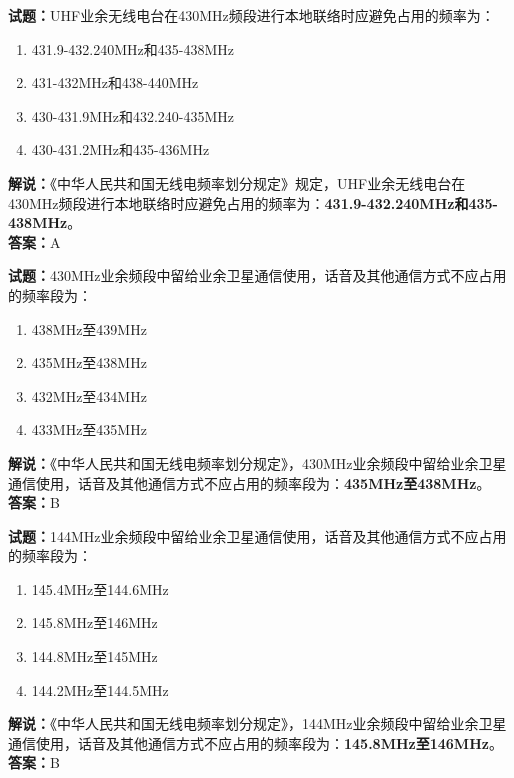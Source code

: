 \documentclass{ctexbook}
\begin{document}
\bigskip


\noindent\textbf{试题：}UHF业余无线电台在430\unit{\MHz}频段进行本地联络时应避免占用的频率为：
\begin{enumerate}[leftmargin=3em]
\item 431.9-432.240\unit{\MHz}和435-438\unit{\MHz}
\item 431-432\unit{\MHz}和438-440\unit{\MHz}
\item 430-431.9\unit{\MHz}和432.240-435\unit{\MHz}
\item 430-431.2\unit{\MHz}和435-436\unit{\MHz}
\end{enumerate}
\noindent\textbf{解说：}《中华人民共和国无线电频率划分规定》规定，UHF业余无线电台在430\unit{\MHz}频段进行本地联络时应避免占用的频率为：\textbf{431.9-432.240\unit{\MHz}和435-438\unit{\MHz}}。\\\noindent\textbf{答案：}A



\bigskip


\noindent\textbf{试题：}430\unit{\MHz}业余频段中留给业余卫星通信使用，话音及其他通信方式不应占用的频率段为：
\begin{enumerate}[leftmargin=3em]
\item 438\unit{\MHz}至439\unit{\MHz}
\item 435\unit{\MHz}至438\unit{\MHz}
\item 432\unit{\MHz}至434\unit{\MHz}
\item 433\unit{\MHz}至435\unit{\MHz}
\end{enumerate}
\noindent\textbf{解说：}《中华人民共和国无线电频率划分规定》，430\unit{\MHz}业余频段中留给业余卫星通信使用，话音及其他通信方式不应占用的频率段为：\textbf{435\unit{\MHz}至438\unit{\MHz}}。\\\noindent\textbf{答案：}B



\bigskip


\noindent\textbf{试题：}144\unit{\MHz}业余频段中留给业余卫星通信使用，话音及其他通信方式不应占用的频率段为：
\begin{enumerate}[leftmargin=3em]
\item 145.4\unit{\MHz}至144.6\unit{\MHz}
\item 145.8\unit{\MHz}至146\unit{\MHz}
\item 144.8\unit{\MHz}至145\unit{\MHz}
\item 144.2\unit{\MHz}至144.5\unit{\MHz}
\end{enumerate}
\noindent\textbf{解说：}《中华人民共和国无线电频率划分规定》，144\unit{\MHz}业余频段中留给业余卫星通信使用，话音及其他通信方式不应占用的频率段为：\textbf{145.8\unit{\MHz}至146\unit{\MHz}}。\\\noindent\textbf{答案：}B
\end{document}
